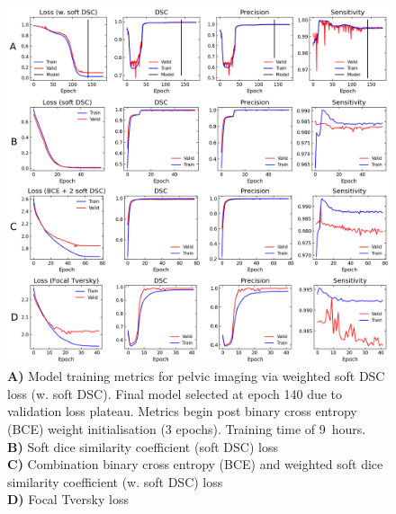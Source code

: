\begin{figure}[H]
	\begin{center}
		\hspace*{-1.2cm}\includegraphics[width=1.15\textwidth]{figures/prostate_metrics_all}
		\caption{\textbf{A)} Model training metrics for pelvic imaging via weighted soft DSC loss (w. soft DSC). Final model selected at epoch 140 due to validation loss plateau. Metrics begin post binary cross entropy (BCE) weight initialisation (3 epochs). Training time of 9~hours. \\
		\textbf{B)} Soft dice similarity coefficient (soft DSC) loss \\
		\textbf{C)} Combination binary cross entropy (BCE) and weighted soft dice similarity coefficient (w. soft DSC) loss\\
		\textbf{D)}  Focal Tversky loss}
		\label{fig:prostate_metrics}
	\end{center}
\end{figure}


